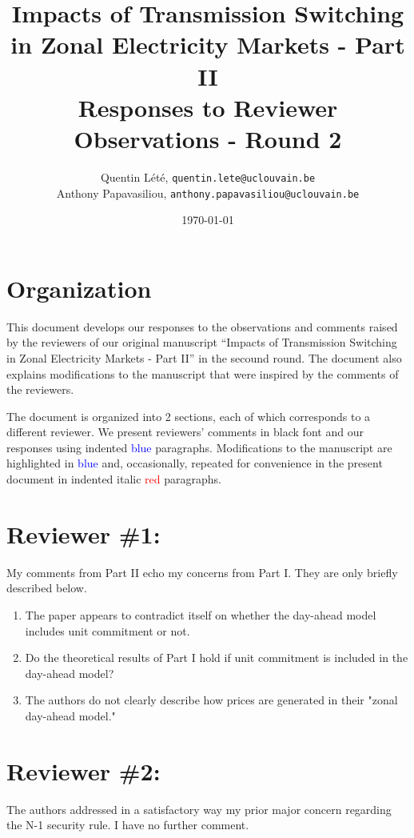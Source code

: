 \documentclass[a4paper,11pt]{article}
\title{Impacts of Transmission Switching in Zonal Electricity Markets - Part II \\[.25cm]
	\Large{Responses to Reviewer Observations - Round 2}}
\author{Quentin Lété, \texttt{quentin.lete@uclouvain.be} \\
	Anthony Papavasiliou, \texttt{anthony.papavasiliou@uclouvain.be}}
\date{\today}
\begin{document}
\maketitle

\section*{Organization}

This document develops our responses to the observations and comments raised by the reviewers of our original manuscript ``Impacts of Transmission Switching in Zonal Electricity Markets - Part II'' in the secound round. The document also explains modifications to the manuscript that were inspired by the comments of the reviewers.

The document is organized into 2 sections, each of which corresponds to a different reviewer. We present reviewers' comments in black font and our responses using indented \textcolor{blue}{blue} paragraphs. Modifications to the manuscript are highlighted in \textcolor{blue}{blue} and, occasionally, repeated for convenience in the present document in indented italic \textcolor{red}{red} paragraphs.

\section{Reviewer \#1:}
My comments from Part II echo my concerns from Part I. They are only briefly described below.
\begin{enumerate}
    \item The paper appears to contradict itself on whether the day-ahead model includes unit commitment or not.
    \item Do the theoretical results of Part I hold if unit commitment is included in the day-ahead model?
    \item The authors do not clearly describe how prices are generated in their "zonal day-ahead model."
\end{enumerate}

\section{Reviewer \#2:}
The authors addressed in a satisfactory way my prior major concern regarding the N-1 security rule. I have no further comment.



\end{document}

